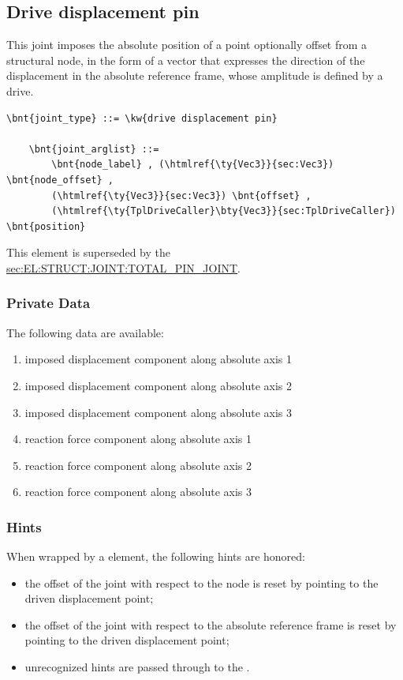 \subsection{Drive displacement pin}
\label{sec:EL:JOINT:DRIVEDISPLACEMENTPIN}
This joint imposes the absolute position of a point optionally offset
from a structural node, in the form of a vector that expresses 
the direction of the displacement in the absolute reference frame,
whose amplitude is defined by a drive.
\begin{Verbatim}[commandchars=\\\{\}]
    \bnt{joint_type} ::= \kw{drive displacement pin}

    \bnt{joint_arglist} ::= 
        \bnt{node_label} , (\htmlref{\ty{Vec3}}{sec:Vec3}) \bnt{node_offset} ,
        (\htmlref{\ty{Vec3}}{sec:Vec3}) \bnt{offset} ,
        (\htmlref{\ty{TplDriveCaller}\bty{Vec3}}{sec:TplDriveCaller}) \bnt{position}
\end{Verbatim}
This element is superseded by the
\hyperref{\kw{total pin joint}}{\kw{total pin joint}, see Section~}{}{sec:EL:STRUCT:JOINT:TOTAL_PIN_JOINT}.

\subsubsection{Private Data}
The following data are available:
\begin{enumerate}
\item {} imposed displacement component along absolute axis 1
\item {} imposed displacement component along absolute axis 2
\item {} imposed displacement component along absolute axis 3
\item {} reaction force component along absolute axis 1
\item {} reaction force component along absolute axis 2
\item {} reaction force component along absolute axis 3
\end{enumerate}

\subsubsection{Hints}
When wrapped by a  element, the following hints are honored:
\begin{itemize}
\item {} the offset of the joint
with respect to the node is reset by pointing 
to the driven displacement point;
\item {} the offset of the joint
with respect to the absolute reference frame is reset by pointing
to the driven displacement point;
\item unrecognized hints are passed through to the .
\end{itemize}



